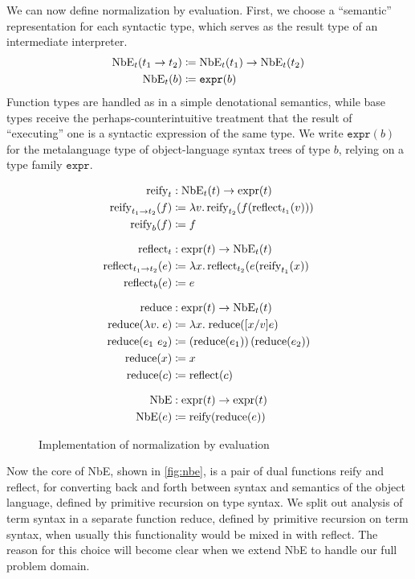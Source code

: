 We can now define normalization by evaluation.
First, we choose a ``semantic'' representation for each syntactic type, which serves as the result type of an intermediate interpreter.
\begin{align*}
  \text{NbE}_t(t_1 \to t_2) & \coloneqq \text{NbE}_t(t_1) \to \text{NbE}_t(t_2) \\
  \text{NbE}_t(b) & \coloneqq \texttt{expr}(b)
\end{align*}
Function types are handled as in a simple denotational semantics, while base types receive the perhaps-counterintuitive treatment that the result of ``executing'' one is a syntactic expression of the same type.
We write $\texttt{expr}(b)$ for the metalanguage type of object-language syntax trees of type $b$, relying on a type family $\texttt{expr}$.

\begin{figure}%
\begin{align*}
  \text{reify}_t & : \text{NbE}_t(t) \to \text{expr}(t) \\
  \text{reify}_{t_1 \to t_2}(f) & \defeq \lambda v.\,\text{reify}_{t_2}(f(\text{reflect}_{t_1}(v))) \\
  \text{reify}_{b}(f) & \defeq f \\ \noalign{\vskip7pt}
  \text{reflect}_t & : \text{expr}(t) \to \text{NbE}_t(t) \\
  \text{reflect}_{t_1\to t_2}(e) & \defeq \lambda x.\,\text{reflect}_{t_2}(e(\text{reify}_{t_1}(x)) \\
  \text{reflect}_{b}(e) & \defeq e \\ \noalign{\vskip7pt}
  \text{reduce} & : \text{expr}(t) \to \text{NbE}_t(t) \\
  \text{reduce}(\lambda v. \; e) & \defeq \lambda x. \; \text{reduce}([x/v]e) \\
  \text{reduce}(e_1~e_2) & \defeq \left(\text{reduce}(e_1)\right)(\text{reduce}(e_2)) \\
  \text{reduce}(x) & \defeq x \\
  \text{reduce}(c) & \defeq \text{reflect}(c) \\ \noalign{\vskip7pt}
  \text{NbE} & : \text{expr}(t) \to \text{expr}(t) \\
  \text{NbE}(e) & \defeq \text{reify}(\text{reduce}(e))
\end{align*}
\caption{\label{fig:nbe}Implementation of normalization by evaluation}
\end{figure}

Now the core of NbE, shown in \autoref{fig:nbe}, is a pair of dual functions reify and reflect, for converting back and forth between syntax and semantics of the object language, defined by primitive recursion on type syntax.
We split out analysis of term syntax in a separate function reduce, defined by primitive recursion on term syntax, when usually this functionality would be mixed in with reflect.
The reason for this choice will become clear when we extend NbE to handle our full problem domain.

